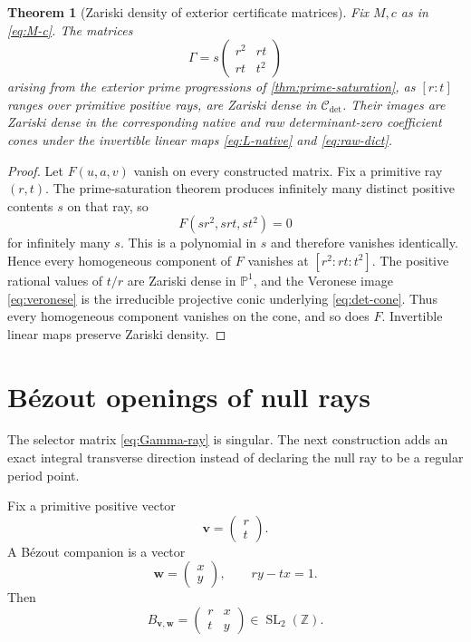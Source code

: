 \documentclass[11pt]{article}
\newtheorem{theorem}{Theorem}[section]
\theoremstyle{definition}
\theoremstyle{remark}
\newcommand{\Z}{\mathbb Z}
\newcommand{\Pone}{\mathbb P^1}
\newcommand{\SL}{\operatorname{SL}}
\newcommand{\1}{\mathbf 1}
\newcommand{\mat}[4]{\begin{pmatrix}#1&#2\\#3&#4\end{pmatrix}}
\begin{document}
\begin{theorem}[Zariski density of exterior certificate matrices]
\label{thm:zariski}
Fix $M,c$ as in \eqref{eq:M-c}.  The matrices
\begin{equation}\label{eq:certificate-matrices}
 \Gamma=s\mat{r^2}{rt}{rt}{t^2}
\end{equation}
arising from the exterior prime progressions of
\cref{thm:prime-saturation}, as $[r:t]$ ranges over primitive positive rays,
are Zariski dense in $\mathscr C_{\det}$.  Their images are Zariski dense in
the corresponding native and raw determinant-zero coefficient cones under
the invertible linear maps \eqref{eq:L-native} and \eqref{eq:raw-dict}.
\end{theorem}

\begin{proof}
Let $F(u,a,v)$ vanish on every constructed matrix.  Fix a primitive ray
$(r,t)$.  The prime-saturation theorem produces infinitely many distinct
positive contents $s$ on that ray, so
\[
 F(sr^2,srt,st^2)=0
\]
for infinitely many $s$.  This is a polynomial in $s$ and therefore vanishes
identically.  Hence every homogeneous component of $F$ vanishes at
$[r^2:rt:t^2]$.  The positive rational values of $t/r$ are Zariski dense in
$\Pone$, and the Veronese image \eqref{eq:veronese} is the irreducible
projective conic underlying \eqref{eq:det-cone}.  Thus every homogeneous
component vanishes on the cone, and so does $F$.  Invertible linear maps
preserve Zariski density.
\end{proof}

\section{Bézout openings of null rays}

The selector matrix \eqref{eq:Gamma-ray} is singular.  The next construction
adds an exact integral transverse direction instead of declaring the null ray
to be a regular period point.

Fix a primitive positive vector
\begin{equation}\label{eq:v-vector}
 \mathbf v=\begin{pmatrix}r\\t\end{pmatrix}.
\end{equation}
A Bézout companion is a vector
\begin{equation}\label{eq:w-vector}
 \mathbf w=\begin{pmatrix}x\\y\end{pmatrix},
 \qquad ry-tx=1.
\end{equation}
Then
\begin{equation}\label{eq:Bvw}
 B_{\mathbf v,\mathbf w}
 =\begin{pmatrix}r&x\\t&y\end{pmatrix}\in\SL_2(\Z).
\end{equation}
\end{document}
